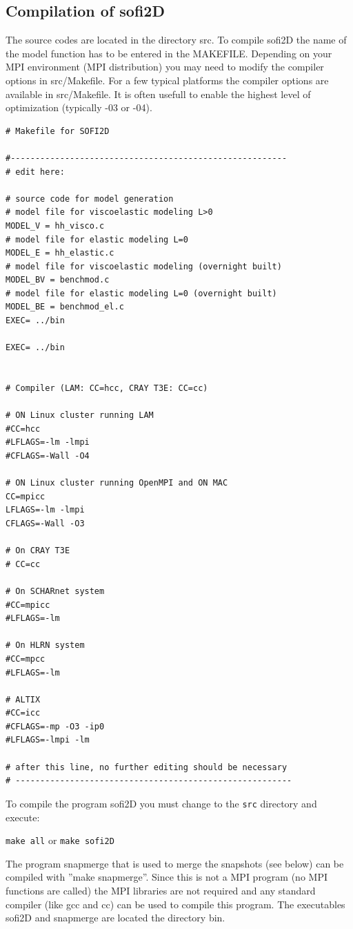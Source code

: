 \documentclass[11pt,onecolumn,oneside]{article}
\begin{document}
\subsection{Compilation of sofi2D}
\label{compexec}
The source codes are located in the directory src. To compile sofi2D the name of the model function has to be entered in the MAKEFILE. Depending on your MPI environment (MPI distribution) you may need to modify the compiler options in src/Makefile. For a few typical platforms the compiler options are available in src/Makefile. It is often usefull to enable the highest level of optimization (typically -03 or -04). 
\begin{verbatim}
# Makefile for SOFI2D

#--------------------------------------------------------
# edit here:

# source code for model generation
# model file for viscoelastic modeling L>0
MODEL_V = hh_visco.c
# model file for elastic modeling L=0
MODEL_E = hh_elastic.c
# model file for viscoelastic modeling (overnight built)
MODEL_BV = benchmod.c
# model file for elastic modeling L=0 (overnight built)
MODEL_BE = benchmod_el.c
EXEC= ../bin

EXEC= ../bin


# Compiler (LAM: CC=hcc, CRAY T3E: CC=cc)

# ON Linux cluster running LAM
#CC=hcc
#LFLAGS=-lm -lmpi 
#CFLAGS=-Wall -O4

# ON Linux cluster running OpenMPI and ON MAC
CC=mpicc
LFLAGS=-lm -lmpi 
CFLAGS=-Wall -O3 

# On CRAY T3E
# CC=cc

# On SCHARnet system
#CC=mpicc
#LFLAGS=-lm  

# On HLRN system
#CC=mpcc
#LFLAGS=-lm  

# ALTIX
#CC=icc
#CFLAGS=-mp -O3 -ip0
#LFLAGS=-lmpi -lm 

# after this line, no further editing should be necessary
# --------------------------------------------------------
\end{verbatim}

To compile the program sofi2D you must change to the \texttt{src} directory and execute:

\texttt{make all}  
or
\texttt{make sofi2D}  

The program snapmerge that is used to merge the snapshots (see below) can be compiled with ''make snapmerge''. Since this is not a MPI program (no MPI functions are called) the MPI libraries are not required and any standard compiler (like gcc and cc) can be used to compile this program. The executables sofi2D and snapmerge are located the directory bin.
\end{document}
